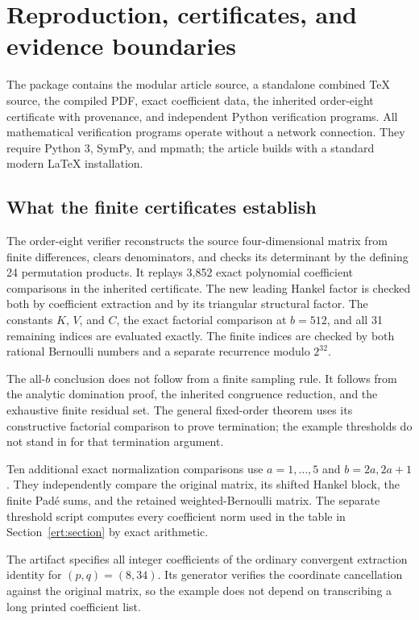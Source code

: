 \section{Reproduction, certificates, and evidence boundaries}
\label{sec:reproduce}

The package contains the modular article source, a standalone combined
\TeX{} source, the compiled PDF, exact coefficient data, the inherited
order-eight certificate with provenance, and independent Python
verification programs.  All mathematical verification programs operate
without a network connection.  They require Python 3, SymPy, and mpmath;
the article builds with a standard modern \LaTeX{} installation.

\subsection{What the finite certificates establish}

The order-eight verifier reconstructs the source four-dimensional
matrix from finite differences, clears denominators, and checks its
determinant by the defining 24 permutation products.  It replays
3,852 exact polynomial coefficient comparisons in the inherited
certificate.  The new leading Hankel factor is checked both by
coefficient extraction and by its triangular structural factor.
The constants $K$, $V$, and $C$, the exact factorial comparison at
$b=512$, and all 31 remaining indices are evaluated exactly.  The
finite indices are checked by both rational Bernoulli numbers and a
separate recurrence modulo $2^{32}$.

The all-$b$ conclusion does not follow from a finite sampling rule.
It follows from the analytic domination proof, the inherited
congruence reduction, and the exhaustive finite residual set.  The
general fixed-order theorem uses its constructive factorial comparison
to prove termination; the example thresholds do not stand in for
that termination argument.

Ten additional exact normalization comparisons use $a=1,\ldots,5$
and $b=2a,2a+1$.  They independently compare the original matrix,
its shifted Hankel block, the finite Pad\'e sums, and the retained
weighted-Bernoulli matrix.  The separate threshold script computes
every coefficient norm used in the table in
Section~\ref{ert:section} by exact arithmetic.

The artifact  specifies all integer
coefficients of the ordinary convergent extraction identity for
$(p,q)=(8,34)$.  Its generator verifies the coordinate cancellation
against the original matrix, so the example does not depend on
transcribing a long printed coefficient list.

